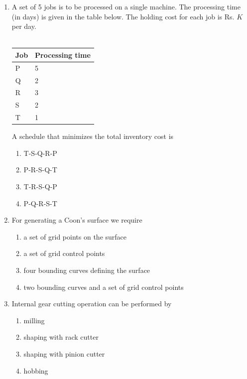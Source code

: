\documentclass[journal,12pt,onecolumn]{IEEEtran}
\begin{document}
\begin{enumerate}
    \item A set of 5 jobs is to be processed on a single machine. The processing time (in days) is given in the table below. The holding cost for each job is Rs. $K$ per day.\\\\
          \begin{center}
              \begin{tabular}{|l|l|}
                  \hline
                  \textbf{Job} & \textbf{Processing time} \\
                  \hline
                  P            & 5                        \\\hline
                  Q            & 2                        \\\hline
                  R            & 3                        \\\hline
                  S            & 2                        \\\hline
                  T            & 1                        \\\hline
              \end{tabular}
          \end{center}
          A schedule that minimizes the total inventory cost is

          \begin{enumerate}
              \item T-S-Q-R-P
              \item P-R-S-Q-T
              \item T-R-S-Q-P
              \item P-Q-R-S-T
          \end{enumerate}

    \item For generating a Coon's surface we require\\
          \begin{enumerate}
              \item a set of grid points on the surface
              \item a set of grid control points
              \item four bounding curves defining the surface
              \item two bounding curves and a set of grid control points
          \end{enumerate}

    \item Internal gear cutting operation can be performed by\\
          \begin{enumerate}
              \item milling
              \item shaping with rack cutter
              \item shaping with pinion cutter
              \item hobbing
          \end{enumerate}



\end{enumerate}
\end{document}
